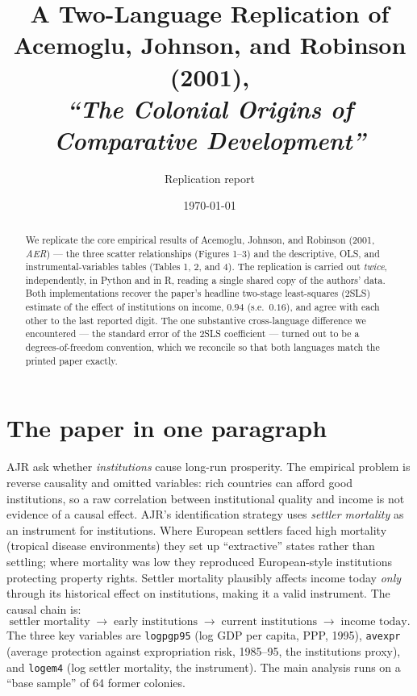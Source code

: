 \documentclass[11pt]{article}
\title{\textbf{A Two-Language Replication of}\\
Acemoglu, Johnson, and Robinson (2001),\\
\emph{``The Colonial Origins of Comparative Development''}}
\author{Replication report}
\date{\today}
\begin{document}
\maketitle

\begin{abstract}
\noindent We replicate the core empirical results of Acemoglu, Johnson, and
Robinson (2001, \emph{AER}) --- the three scatter relationships (Figures 1--3)
and the descriptive, OLS, and instrumental-variables tables (Tables 1, 2, and
4). The replication is carried out \emph{twice}, independently, in Python and in
R, reading a single shared copy of the authors' data. Both implementations
recover the paper's headline two-stage least-squares (2SLS) estimate of the
effect of institutions on income, $0.94$ (s.e.\ $0.16$), and agree with each
other to the last reported digit. The one substantive cross-language difference
we encountered --- the standard error of the 2SLS coefficient --- turned out to
be a degrees-of-freedom convention, which we reconcile so that both languages
match the printed paper exactly.
\end{abstract}

\section{The paper in one paragraph}

AJR ask whether \emph{institutions} cause long-run prosperity. The empirical
problem is reverse causality and omitted variables: rich countries can afford
good institutions, so a raw correlation between institutional quality and income
is not evidence of a causal effect. AJR's identification strategy uses
\emph{settler mortality} as an instrument for institutions. Where European
settlers faced high mortality (tropical disease environments) they set up
``extractive'' states rather than settling; where mortality was low they
reproduced European-style institutions protecting property rights. Settler
mortality plausibly affects income today \emph{only} through its historical
effect on institutions, making it a valid instrument. The causal chain is:
\[
\text{settler mortality} \;\longrightarrow\; \text{early institutions}
\;\longrightarrow\; \text{current institutions} \;\longrightarrow\;
\text{income today}.
\]
The three key variables are \texttt{logpgp95} (log GDP per capita, PPP, 1995),
\texttt{avexpr} (average protection against expropriation risk, 1985--95, the
institutions proxy), and \texttt{logem4} (log settler mortality, the
instrument). The main analysis runs on a ``base sample'' of 64 former colonies.
\end{document}
